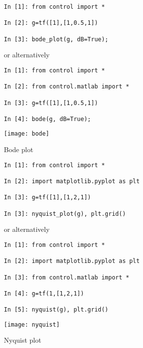\begin{figure}[htbp]
\begin{minipage}[t]{0.55\textwidth}
  \vspace{0pt}
\begin{lstlisting}[linewidth=7cm,xleftmargin=0cm]
In [1]: from control import *

In [2]: g=tf([1],[1,0.5,1])

In [3]: bode_plot(g, dB=True);
\end{lstlisting}

or alternatively

\begin{lstlisting}[linewidth=7cm,xleftmargin=0cm]
In [1]: from control import *

In [2]: from control.matlab import *

In [3]: g=tf([1],[1,0.5,1])

In [4]: bode(g, dB=True);
\end{lstlisting}
\end{minipage}%
\begin{minipage}[t]{0.5\textwidth}
  \vspace{0pt} \centering
  \texttt{[image: bode]}
\end{minipage}
\caption{Bode plot}
\label{F6}
\end{figure}

\begin{figure}[htbp]
\begin{minipage}[t]{0.55\textwidth}
  \vspace{0pt}
\begin{lstlisting}[linewidth=7cm,xleftmargin=0cm]
In [1]: from control import *

In [2]: import matplotlib.pyplot as plt

In [3]: g=tf([1],[1,2,1])

In [3]: nyquist_plot(g), plt.grid()
\end{lstlisting}

or alternatively

\begin{lstlisting}[linewidth=7cm,xleftmargin=0cm]
In [1]: from control import *

In [2]: import matplotlib.pyplot as plt

In [3]: from control.matlab import *

In [4]: g=tf(1,[1,2,1])

In [5]: nyquist(g), plt.grid()
\end{lstlisting}

\end{minipage}%
\begin{minipage}[t]{0.5\textwidth}
  \vspace{0pt} \centering
  \texttt{[image: nyquist]}
\end{minipage}
\caption{Nyquist plot}
\label{F7}
\end{figure}

